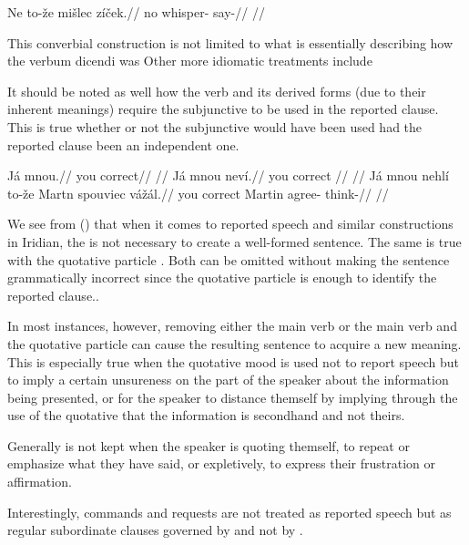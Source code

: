 \pex
\begingl
\gla Ne to-\v{z}e mi\v{s}lec z\'i\v{c}ek.//
\glb no  whisper- say-//
\glft {}//
\endgl
\xe


This converbial construction is not limited to what is essentially describing how the verbum dicendi was  Other more idiomatic treatments include


It should be noted as well how the verb  and its derived forms (due to their inherent meanings) require the subjunctive to be used in the reported clause. This is true whether or not the subjunctive would have been used had the reported clause been an independent one.


\pex
\a
\begingl
  \gla Já mnou.//
  \glb you correct//
  \glft {}//
\endgl
\a
\begingl
  \gla Já mnou nev\'i.//
  \glb you correct //
  \glft {}//
\endgl
\a
\begingl
  \gla Já mnou nehl\'i to-\v{z}e Martn spouviec v\'a\v{z}\'al.//
  \glb you correct   Martin agree- think-//
  \glft {}//
\endgl
\xe



We see from () that when it comes to reported speech and similar constructions in Iridian, the  is not necessary to create a well-formed sentence. The same is true with the quotative particle . Both can be omitted without making the sentence grammatically incorrect since the quotative particle is enough to identify the reported clause..

In most instances, however, removing either the main verb or the main verb and the quotative particle can cause the resulting sentence to acquire a new meaning. This is especially true when the quotative mood is used not to report speech but to imply a certain unsureness on the part of the speaker about the information being presented, or for the speaker to distance themself by implying through the use of the quotative that the information is secondhand and not theirs.

Generally  is not kept when the speaker is quoting themself, to repeat or emphasize what they have said, or expletively, to express their frustration or affirmation.


Interestingly, commands and requests are not treated as reported speech but as regular subordinate clauses governed by  and not by .

